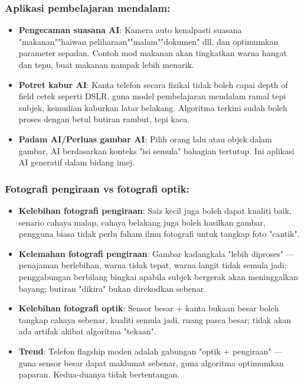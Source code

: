 \subsubsection*{Aplikasi pembelajaran mendalam:}

\begin{itemize}
  \item \textbf{Pengecaman suasana AI}: Kamera auto kenalpasti suasana "makanan""haiwan peliharaan""malam""dokumen" dll, dan optimumkan parameter sepadan. Contoh mod makanan akan tingkatkan warna hangat dan tepu, buat makanan nampak lebih menarik.
  \item \textbf{Potret kabur AI}: Kanta telefon secara fizikal tidak boleh capai depth of field cetek seperti DSLR, guna model pembelajaran mendalam ramal tepi subjek, kemudian kaburkan latar belakang. Algoritma terkini sudah boleh proses dengan betul butiran rambut, tepi kaca.
  \item \textbf{Padam AI/Perluas gambar AI}: Pilih orang lalu atau objek dalam gambar, AI berdasarkan konteks "isi semula" bahagian tertutup. Ini aplikasi AI generatif dalam bidang imej.
\end{itemize}

\subsubsection*{Fotografi pengiraan vs fotografi optik:}

\begin{itemize}
  \item \textbf{Kelebihan fotografi pengiraan}: Saiz kecil juga boleh dapat kualiti baik, senario cahaya malap, cahaya belakang juga boleh hasilkan gambar, pengguna biasa tidak perlu faham ilmu fotografi untuk tangkap foto "cantik".
  \item \textbf{Kelemahan fotografi pengiraan}: Gambar kadangkala "lebih diproses" — penajaman berlebihan, warna tidak tepat, warna langit tidak semula jadi; penggabungan berbilang bingkai apabila subjek bergerak akan meninggalkan bayang; butiran "dikira" bukan direkodkan sebenar.
  \item \textbf{Kelebihan fotografi optik}: Sensor besar + kanta bukaan besar boleh tangkap cahaya sebenar, kualiti semula jadi, ruang pasca besar; tidak akan ada artifak akibat algoritma "tekaan".
  \item \textbf{Trend}: Telefon flagship moden adalah gabungan "optik + pengiraan" — guna sensor besar dapat maklumat sebenar, guna algoritma optimumkan paparan. Kedua-duanya tidak bertentangan.
\end{itemize}

